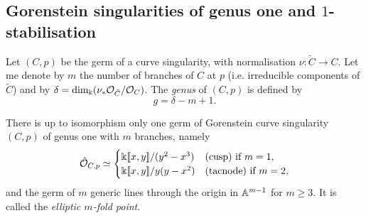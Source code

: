 \subsection{Gorenstein singularities of genus one and $1$-stabilisation}
\begin{dfn}\label{def:genus}
 Let $(C,p)$ be the germ of a curve singularity, with normalisation $\nu\colon\tilde{C}\to C$. Let me denote by $m$ the number of branches of $C$ at $p$ (i.e. irreducible components of $\tilde{C}$) and by $\delta=\dim_{\Bbbk}(\nu_*\mathcal{O}_{\tilde{C}}/\mathcal{O}_C)$. The \emph{genus} of $(C,p)$ is defined by \[g=\delta-m+1.\]
\end{dfn}
\begin{prop}\cite[Proposition A.3]{SMY1}
 There is up to isomorphism only one germ of Gorenstein curve singularity $(C,p)$ of genus one with $m$ branches, namely
 \[\hat{\mathcal{O}}_{C,p}\simeq\begin{cases} \Bbbk[\![x,y]\!]/(y^2-x^3) & \text{(cusp) if } m=1, \\ \Bbbk[\![x,y]\!]/y(y-x^2) &  \text{(tacnode) if } m=2,\end{cases}\]
 and the germ of $m$ generic lines through the origin in $\mathbb{A}^{m-1}$ for $m\geq 3$. It is called the \emph{elliptic $m$-fold point}.
\end{prop}

